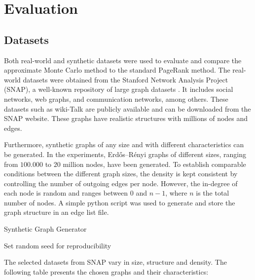\section{Evaluation}
\subsection{Datasets}
 Both real-world and synthetic datasets were used to evaluate and compare the approximate Monte Carlo method to the standard PageRank method. The real-world datasets were obtained from the Stanford Network Analysis Project (SNAP), a well-known repository of large graph datasets \cite{standford_university_snap_2025}. It includes social networks, web graphs, and communication networks, among others. These datasets such as wiki-Talk are publicly available and can be downloaded from the SNAP website. These graphs have realistic structures with millions of nodes and edges. \par
Furthermore, synthetic graphs of any size and with different characteristics can be generated. In the experiments, Erdős–Rényi graphs of different sizes, ranging from $100.000$ to $20$ million nodes, have been generated. To establish comparable conditions between the different graph sizes, the density is kept consistent by controlling the number of outgoing edges per node. However, the in-degree of each node is random and ranges between $0$ and $n-1$, where $n$ is the total number of nodes. A simple python script was used to generate and store the graph structure in an edge list file.

\vspace{1.0em}
\begin{algorithm}[H]
\caption{Synthetic Graph Generator}

Set random seed for reproducibility\;
\end{algorithm} 
\vspace{1.0em}

The selected datasets from SNAP vary in size, structure and density. The following table presents the chosen graphs and their characteristics: 

